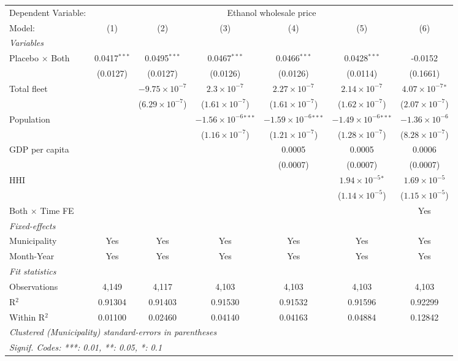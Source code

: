 \documentclass[
]{article}
\begin{document}
\begin{tabular}{lcccccc}
\tabularnewline\midrule\midrule
Dependent Variable:&\multicolumn{6}{c}{Ethanol wholesale price}\\
Model:&(1) & (2) & (3) & (4) & (5) & (6)\\
\midrule \emph{Variables}&   &   &   &   &   &  \\
Placebo $\times $ Both & 0.0417$^{***}$ & 0.0495$^{***}$ & 0.0467$^{***}$ & 0.0466$^{***}$ & 0.0428$^{***}$ & -0.0152\\
  &(0.0127) & (0.0127) & (0.0126) & (0.0126) & (0.0114) & (0.1661)\\
Total fleet &    & $-9.75\times 10^{-7}$ & $2.3\times 10^{-7}$ & $2.27\times 10^{-7}$ & $2.14\times 10^{-7}$ & $4.07\times 10^{-7}$$^{*}$\\
  &   & ($6.29\times 10^{-7}$) & ($1.61\times 10^{-7}$) & ($1.61\times 10^{-7}$) & ($1.62\times 10^{-7}$) & ($2.07\times 10^{-7}$)\\
Population &    &    & $-1.56\times 10^{-6}$$^{***}$ & $-1.59\times 10^{-6}$$^{***}$ & $-1.49\times 10^{-6}$$^{***}$ & $-1.36\times 10^{-6}$\\
  &   &    & ($1.16\times 10^{-7}$) & ($1.21\times 10^{-7}$) & ($1.28\times 10^{-7}$) & ($8.28\times 10^{-7}$)\\
GDP per capita &    &    &    & 0.0005 & 0.0005 & 0.0006\\
  &   &    &    & (0.0007) & (0.0007) & (0.0007)\\
HHI &    &    &    &    & $1.94\times 10^{-5}$$^{*}$ & $1.69\times 10^{-5}$\\
  &   &    &    &    & ($1.14\times 10^{-5}$) & ($1.15\times 10^{-5}$)\\
Both $\times$ Time FE &  &  &  &  &  & Yes\\
\midrule \emph{Fixed-effects}&   &   &   &   &   &  \\
Municipality & Yes & Yes & Yes & Yes & Yes & Yes\\
Month-Year & Yes & Yes & Yes & Yes & Yes & Yes\\
\midrule \emph{Fit statistics}&  & & & & & \\
Observations & 4,149&4,117&4,103&4,103&4,103&4,103\\
R$^2$ & 0.91304&0.91403&0.91530&0.91532&0.91596&0.92299\\
Within R$^2$ & 0.01100&0.02460&0.04140&0.04163&0.04884&0.12842\\
\midrule\midrule\multicolumn{7}{l}{\emph{Clustered (Municipality) standard-errors in parentheses}}\\
\multicolumn{7}{l}{\emph{Signif. Codes: ***: 0.01, **: 0.05, *: 0.1}}\\
\end{tabular}
\end{document}
